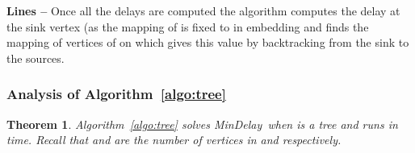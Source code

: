 \documentclass[journal]{IEEEtran}
\newtheorem{theorem}{{\bf Theorem}}
\newcommand{\mindelay}{\textsf{MinDelay}}
\begin{document}
\textbf{Lines --} Once all the delays are computed the algorithm
  computes the delay at the sink vertex  (as the mapping of
   is fixed to  in embedding  and finds the
  mapping of vertices of  on  which gives this value
  by backtracking from the sink to the sources.


\subsubsection{Analysis of Algorithm~\ref{algo:tree}}

\begin{theorem}
  \label{thm:mindelay_tree}
  Algorithm~\ref{algo:tree} solves \mindelay\ when  is a
  tree and runs in  time. Recall that  and  are the
  number of vertices in  and  respectively.
\end{theorem}
\end{document}
